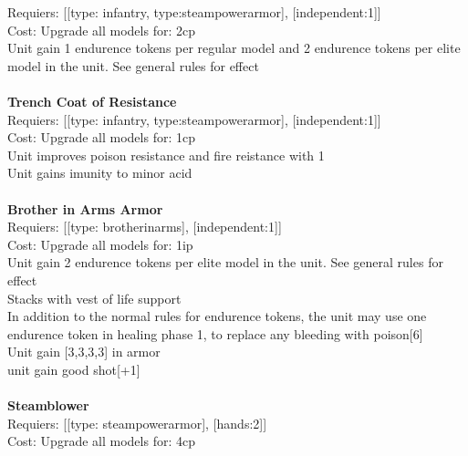 Requiers: [[type: infantry, type:steampowerarmor], [independent:1]] \\
Cost: Upgrade all models for: 2cp \\
Unit gain 1 endurence tokens per regular model  and 2 endurence tokens per elite model in the unit. See general rules for effect\\ 









\ \\
{\bf Trench Coat of Resistance } \\

Requiers: [[type: infantry, type:steampowerarmor], [independent:1]] \\
Cost: Upgrade all models for: 1cp \\
Unit improves poison resistance and fire reistance with 1\\ 
Unit gains imunity to minor acid\\ 









\ \\
{\bf Brother in Arms Armor } \\

Requiers: [[type: brotherinarms], [independent:1]] \\
Cost: Upgrade all models for: 1ip \\
Unit gain 2 endurence tokens per elite model in the unit. See general rules for effect\\ 
Stacks with vest of life support\\ 
In addition to the normal rules for endurence tokens, the unit may use one endurence token in healing phase 1, to replace any bleeding with poison[6]\\ 
Unit gain [3,3,3,3] in armor\\ 
unit gain good shot[+1]\\ 









\ \\
{\bf Steamblower } \\

Requiers: [[type: steampowerarmor], [hands:2]] \\
Cost: Upgrade all models for: 4cp \\


